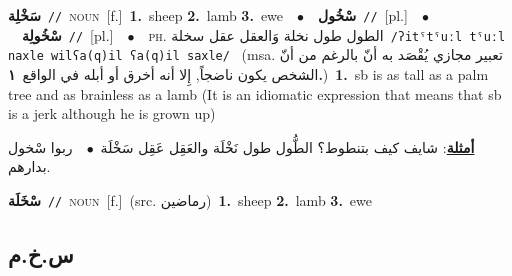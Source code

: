 \documentclass[10pt,a4paper,twoside]{article} %
\begin{document}
\begin{multicols}{2}
{\setlength\topsep{0pt}\textbf{\foreignlanguage{arabic}{سَخْلِة}}\ {\color{gray}\texttt{//}\color{black}}\ \textsc{noun}\ [f.]\ \textbf{1.}~sheep  \textbf{2.}~lamb  \textbf{3.}~ewe\ \ $\bullet$\ \ \setlength\topsep{0pt}\textbf{\foreignlanguage{arabic}{سْخُول}}\ {\color{gray}\texttt{//}\color{black}}\ [pl.]\ \ $\bullet$\ \ \setlength\topsep{0pt}\textbf{\foreignlanguage{arabic}{سْخُولِة}}\ {\color{gray}\texttt{//}\color{black}}\ [pl.]\ \ $\bullet$\ \ \textsc{ph.} \color{gray} \foreignlanguage{arabic}{الطول طول نخلة وَالعقل عقل سخلة}\color{black}\ {\color{gray}\texttt{/{\sffamily ʔitˤtˤuːl tˤuːl naxle wilʕa(q)il ʕa(q)il saxle}/}\color{black}}\ \color{gray} (msa. \foreignlanguage{arabic}{تعبير مجازي يُقْصَد به أنّ بالرغم من أنّ الشخص يكون ناضجاً, إِلا أنه أخرق أو أبله في الواقع}~\foreignlanguage{arabic}{\textbf{١.}})\color{black}\ \textbf{1.}~sb is as tall as a palm tree and as brainless as a lamb (It is an idiomatic expression that means that sb is a jerk although he is grown up)\  \begin{flushright}\color{gray}\foreignlanguage{arabic}{\textbf{\underline{\foreignlanguage{arabic}{أمثلة}}}: شايف كيف بتنطوط؟ الطُّول طول نَخْلَة والعَقِل عَقِل سَخْلَة\ $\bullet$\ \  ربوا سْخول بدارهم.}\end{flushright}\color{black}} \vspace{2mm}

{\setlength\topsep{0pt}\textbf{\foreignlanguage{arabic}{سْخَلَة}}\ {\color{gray}\texttt{//}\color{black}}\ \textsc{noun}\ [f.]\ (src. \color{gray}\foreignlanguage{arabic}{رماضين}\color{black})\ \textbf{1.}~sheep  \textbf{2.}~lamb  \textbf{3.}~ewe\ } \vspace{2mm}

\vspace{-3mm}
\subsection*{\color{blue}\foreignlanguage{arabic}{س.خ.م}\color{blue}{}} 


\end{multicols}
\end{document}
